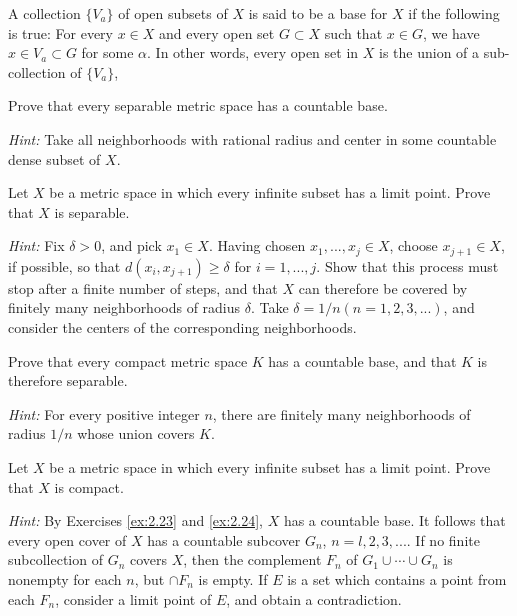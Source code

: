 \begin{myExercise}
    \label{ex:2.23}
    A collection $\{V_a\}$ of open subsets of $X$ is said to be a base for $X$ 
    if the following is true: 
    For every $x \in X$ and every open set $G \subset X$ such that $x \in G$, 
    we have $x \in V_a \subset G$ for some $\alpha$. 
    In other words, every open set in $X$ is the union of a 
    sub-collection of $\{V_a\}$,
    
    Prove that every separable metric space has a countable base. 

    \emph{Hint:} Take all neighborhoods with rational radius 
    and center in some countable dense subset of $X$.
\end{myExercise}

\begin{myExercise}
    \label{ex:2.24}
    Let $X$ be a metric space in which every infinite subset has a limit point. 
    Prove that $X$ is separable. 
    
    \emph{Hint:} Fix $\delta > 0$, and pick $x_1 \in X$. 
    Having chosen $x_1, ... , x_j \in X$,
    choose $x_{j+1} \in X$, 
    if possible, so that $d(x_i, x_{j+1})\geq \delta$ for $i = 1, ... ,j$. 
    Show that this process must stop after a finite number of steps, 
    and that $X$ can therefore be covered by finitely many neighborhoods of radius $\delta$. 
    Take $\delta = 1/n (n = 1, 2, 3, ... )$, 
    and consider the centers of the corresponding neighborhoods.
\end{myExercise}


\begin{myExercise}
    \label{ex:2.25}
    Prove that every compact metric space $K$ has a countable base, 
    and that $K$ is therefore separable. 
    
    \emph{Hint:} For every positive integer $n$, 
    there are finitely many neighborhoods of radius $1/n$ whose union covers $K$.
\end{myExercise}


\begin{myExercise}
    \label{ex:2.26}
    Let $X$ be a metric space in which every infinite subset has a limit point. 
    Prove that $X$ is compact. 
    
    \emph{Hint:} By Exercises \ref{ex:2.23} and \ref{ex:2.24}, 
    $X$ has a countable base. 
    It follows that every open cover of $X$ has a countable subcover ${G_n}$, $n = l, 2, 3, ...$.
    If no finite subcollection of ${G_n}$ covers $X$, 
    then the complement $F_n$ of $G_1 \cup \cdots \cup G_n$
    is nonempty for each $n$, but $\cap F_n$ is empty. 
    If $E$ is a set which contains a point from each $F_n$, 
    consider a limit point of $E$, and obtain a contradiction.
\end{myExercise}


